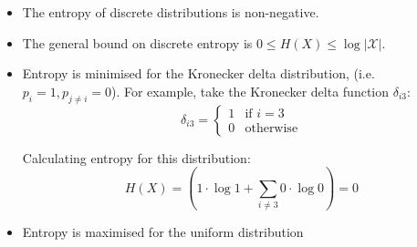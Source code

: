 \begin{itemize}
    \item The entropy of discrete distributions is non-negative.
    \item The general bound on discrete entropy is \( 0 \leq H(X) \leq \log |\mathcal{X}| \).
    \item Entropy is minimised for the Kronecker delta distribution, (i.e. $p_i = 1, p_{j \neq i} = 0$). For example, take the Kronecker delta function \(\delta_{i3}\):
          \[
              \delta_{i3} = \begin{cases}
                  1 & \text{if } i = 3 \\
                  0 & \text{otherwise}
              \end{cases}
          \]
          \begin{center}
          \end{center}
          Calculating entropy for this distribution:
          \[
              H(X) = \left( 1 \cdot \log 1 + \sum_{i \neq 3} 0 \cdot \log 0 \right) = 0
          \]

    \item Entropy is maximised for the uniform distribution
\end{itemize}



